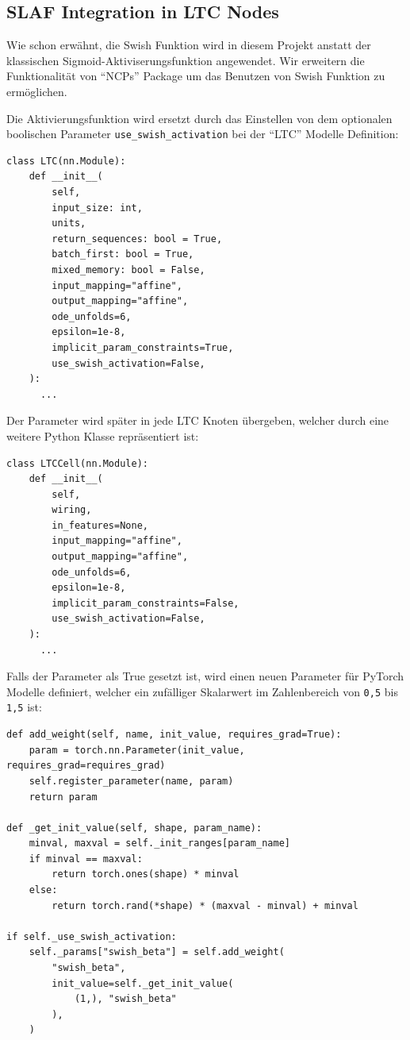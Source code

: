 \documentclass[11pt,ngerman,a4paper,]{article}
\begin{document}
\subsection{SLAF Integration in LTC Nodes}\label{slaf-integration-in-ltc-nodes}

Wie schon erwähnt, die Swish Funktion wird in diesem Projekt anstatt der klassischen Sigmoid-Aktiviserungsfunktion angewendet. Wir erweitern die Funktionalität von ``NCPs'' Package um das Benutzen von Swish Funktion zu ermöglichen.

Die Aktivierungsfunktion wird ersetzt durch das Einstellen von dem optionalen boolischen Parameter \texttt{use\_swish\_activation} bei der ``LTC'' Modelle Definition:

\begin{verbatim}
class LTC(nn.Module):
    def __init__(
        self,
        input_size: int,
        units,
        return_sequences: bool = True,
        batch_first: bool = True,
        mixed_memory: bool = False,
        input_mapping="affine",
        output_mapping="affine",
        ode_unfolds=6,
        epsilon=1e-8,
        implicit_param_constraints=True,
        use_swish_activation=False,
    ):
      ...
\end{verbatim}

Der Parameter wird später in jede LTC Knoten übergeben, welcher durch eine weitere Python Klasse repräsentiert ist:

\begin{verbatim}
class LTCCell(nn.Module):
    def __init__(
        self,
        wiring,
        in_features=None,
        input_mapping="affine",
        output_mapping="affine",
        ode_unfolds=6,
        epsilon=1e-8,
        implicit_param_constraints=False,
        use_swish_activation=False,
    ):
      ...
\end{verbatim}

Falls der Parameter als True gesetzt ist, wird einen neuen Parameter für PyTorch Modelle definiert, welcher ein zufälliger Skalarwert im Zahlenbereich von \texttt{0,5} bis \texttt{1,5} ist:

\begin{verbatim}
def add_weight(self, name, init_value, requires_grad=True):
    param = torch.nn.Parameter(init_value, requires_grad=requires_grad)
    self.register_parameter(name, param)
    return param

def _get_init_value(self, shape, param_name):
    minval, maxval = self._init_ranges[param_name]
    if minval == maxval:
        return torch.ones(shape) * minval
    else:
        return torch.rand(*shape) * (maxval - minval) + minval

if self._use_swish_activation:
    self._params["swish_beta"] = self.add_weight(
        "swish_beta",
        init_value=self._get_init_value(
            (1,), "swish_beta"
        ),
    )
\end{verbatim}
\end{document}
